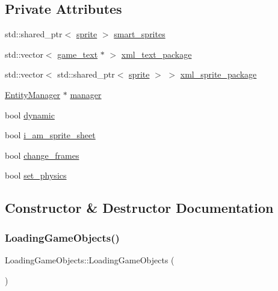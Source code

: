\subsection*{Private Attributes}
\begin{DoxyCompactItemize}
\item 
std\+::shared\+\_\+ptr$<$ \hyperlink{classsprite}{sprite} $>$ \hyperlink{classLoadingGameObjects_af26f1aefb21d2afb084fe9ef410c7bb4}{smart\+\_\+sprites}
\item 
std\+::vector$<$ \hyperlink{classgame__text}{game\+\_\+text} $\ast$ $>$ \hyperlink{classLoadingGameObjects_a1271d3582b99778a702281510accf07d}{xml\+\_\+text\+\_\+package}
\item 
std\+::vector$<$ std\+::shared\+\_\+ptr$<$ \hyperlink{classsprite}{sprite} $>$ $>$ \hyperlink{classLoadingGameObjects_a6ccb8bd56e988b094f34c5c3d93af7cb}{xml\+\_\+sprite\+\_\+package}
\item 
\hyperlink{classEntityManager}{Entity\+Manager} $\ast$ \hyperlink{classLoadingGameObjects_a1efe4fc6981896a112827c40cfcdc010}{manager}
\item 
bool \hyperlink{classLoadingGameObjects_a260a8ca05d2d4859a01b8d69b605393d}{dynamic}
\item 
bool \hyperlink{classLoadingGameObjects_a53ce2ae67a421bd0e9b2b2371b5b3f07}{i\+\_\+am\+\_\+sprite\+\_\+sheet}
\item 
bool \hyperlink{classLoadingGameObjects_abcc5d3d216501141fbf213353635a597}{change\+\_\+frames}
\item 
bool \hyperlink{classLoadingGameObjects_a53fe19b41f07e8ddd0c4c084a4268ec4}{set\+\_\+physics}
\end{DoxyCompactItemize}


\subsection{Constructor \& Destructor Documentation}
\mbox{\label{classLoadingGameObjects_aed114905dd9c0a40377b914a69d5789f}} 
\subsubsection{\texorpdfstring{Loading\+Game\+Objects()}{LoadingGameObjects()}}
{\footnotesize\ttfamily Loading\+Game\+Objects\+::\+Loading\+Game\+Objects (\begin{DoxyParamCaption}{ }\end{DoxyParamCaption})}

